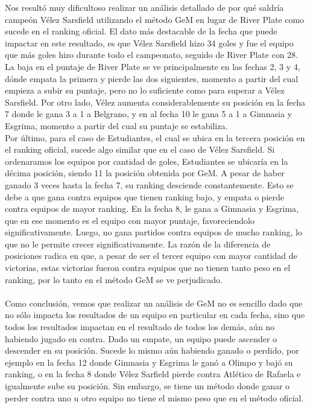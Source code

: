 Nos resultó muy dificultoso realizar un análisis detallado de por qué saldría campeón Vélez Sarsfield utilizando el método GeM en lugar de River Plate como sucede en el ranking oficial. El dato más destacable de la fecha que puede impactar en este resultado, es que Vélez Sarsfield hizo 34 goles y fue el equipo que más goles hizo durante todo el campeonato, seguido de River Plate con 28. La baja en el puntaje de River Plate se ve principalmente en las fechas 2, 3 y 4, dónde empata la primera y pierde las dos siguientes, momento a partir del cual empieza a subir su puntaje, pero no lo suficiente como para superar a Vélez Sarsfield. Por otro lado, Vélez aumenta considerablemente su posición en la fecha 7 donde le gana 3 a 1 a Belgrano, y en al fecha 10 le gana 5 a 1 a Gimnasia y Esgrima, momento a partir del cual su puntaje se estabiliza.\\

Por último, para el caso de Estudiantes, el cual se ubica en la tercera posición en el ranking oficial, sucede algo similar que en el caso de Vélez Sarsfield. Si ordenaramos los equipos por cantidad de goles, Estudiantes se ubicaría en la décima posición, siendo 11 la posición obtenida por GeM. A pesar de haber ganado 3 veces hasta la fecha 7, su ranking desciende constantemente. Esto se debe a que gana contra equipos que tienen ranking bajo, y empata o pierde contra equipos de mayor ranking. En la fecha 8, le gana a Gimnasia y Esgrima, que en ese momento es el equipo con mayor puntaje, favoreciendolo significativamente. Luego, no gana partidos contra equipos de mucho ranking, lo que no le permite crecer significativamente. La razón de la diferencia de posiciones radica en que, a pesar de ser el tercer equipo con mayor cantidad de victorias, estas victorias fueron contra equipos que no tienen tanto peso en el ranking, por lo tanto en el método GeM se ve perjudicado. \\
\\
Como conclusión, vemos que realizar un análisis de GeM no es sencillo dado que no sólo impacta los resultados de un equipo en particular en cada fecha, sino que todos los resultados impactan en el resultado de todos los demás, aún no habiendo jugado en contra. Dado un empate, un equipo puede ascender o descender en su posición. Sucede lo mismo aún habiendo ganado o perdido, por ejemplo en la fecha 12 donde Gimnasia y Esgrima le ganó a Olimpo y bajó su ranking, o en la fecha 8 donde Vélez Sarfield pierde contra Atlético de Rafaela e igualmente sube su posición. Sin embargo, se tiene un método donde ganar o perder contra uno u otro equipo no tiene el mismo peso que en el método oficial.


